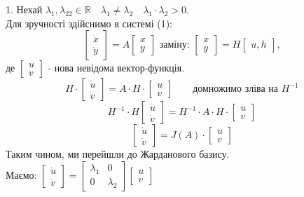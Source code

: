 1. Нехай $\lambda_1 , \lambda_22 \in \mathbb{R} \quad \lambda_1 \neq \lambda_2 \quad \lambda_1 \cdot \lambda_2 > 0.$\\ Для зручності здійснимо в системі (1):
$$
\begin{bmatrix}
 \dot{x}\\
 \dot{y}
\end{bmatrix} = A \begin{bmatrix}
 x \\
 y
\end{bmatrix} \text{ заміну: } \begin{bmatrix}
 x\\
 y
\end{bmatrix} = H \begin{bmatrix}
 u, h
\end{bmatrix},
$$
де $\begin{bmatrix}
 u \\
 v
\end{bmatrix}$ - нова невідома вектор-функція.
$$
H \cdot \begin{bmatrix}
 \dot{u}\\
 \dot{v}
\end{bmatrix} = A \cdot H \cdot \begin{bmatrix}
 u \\
 v
\end{bmatrix} \qquad \text{домножимо зліва на } H^{-1}
$$
$$
H^{-1} \cdot H \begin{bmatrix}
\dot{u}\\
\dot{v}
\end{bmatrix}  =H^{-1} \cdot A \cdot H \cdot \begin{bmatrix}
 u \\
 v
\end{bmatrix}
$$
$$
\begin{bmatrix}
\dot{u}\\
\dot{v}
\end{bmatrix}  =J(A) \cdot \begin{bmatrix}
 u \\
 v
\end{bmatrix}
$$
Таким чином, ми перейшли до Жарданового базису.\\
Маємо: $ \begin{bmatrix}
\dot{u}\\
\dot{v}
\end{bmatrix} = \begin{bmatrix}
 \lambda_1 & 0 \\
 0 & \lambda_2
\end{bmatrix} \begin{bmatrix}
 u \\
 v
\end{bmatrix}$
